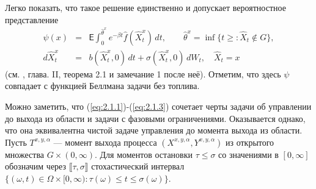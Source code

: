 Легко показать, что такое решение единственно и допускает вероятностное представление
\begin{eqnarray*}
\psi(x) &=& \mathsf E\int_0^{\widehat\theta^x}e^{-\beta t} \widehat f(\widehat X_t^x)\,dt,\qquad \widehat\theta^x=\inf\{t\ge: \widehat X_t\not\in G\},\\
d\widehat X_t^x &=& b(\widehat X_t^x,0)\,dt+\sigma(\widehat X_t^x,0)\,dW_t,\quad \widehat X_t=x
\end{eqnarray*}
(см. \cite{Fre85}, глава. II, теорема 2.1 и замечание 1 после неё). Отметим, что здесь $\psi$ совпадает с функцией Беллмана  задачи без топлива.

Можно заметить, что (\ref{eq:2.1.1})-(\ref{eq:2.1.3}) сочетает черты задачи об управлении до выхода из области и задачи с фазовыми ограничениями. Оказывается однако, что она эквивалентна чистой задаче управления до момента выхода из области. Пусть $T^{x,y,\alpha}$ --- момент выхода процесса $(X^{x,y,\alpha}, Y^{x,y,\alpha})$ из открытого множества $G\times (0,\infty)$. Для моментов остановки $\tau\le\sigma$ со значениями в $[0,\infty]$ обозначим через $\llbracket\tau,\sigma\rrbracket$  стохастический интервал $\{(\omega,t)\in\Omega\times [0,\infty):\tau(\omega)\le t\le\sigma(\omega)\}$.

